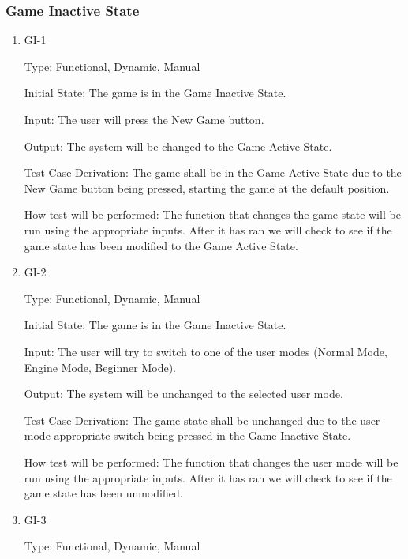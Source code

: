 \documentclass[12pt, titlepage]{article}
\begin{document}
\subsubsection{Game Inactive State}

\begin{enumerate}

  \item{GI-1\\}

  Type: Functional, Dynamic, Manual
                      
  Initial State: The game is in the Game Inactive State.
                      
  Input: The user will press the New Game button.
                      
  Output: The system will be changed to the Game Active State.
                      
  Test Case Derivation: The game shall be in the Game Active State due to the New Game button being pressed,
  starting the game at the default position.
  
  How test will be performed: The function that changes the game state will be run using the appropriate inputs.
  After it has ran we will check to see if the game state has been modified to the Game Active State.

  \item{GI-2\\}

  Type: Functional, Dynamic, Manual
                      
  Initial State: The game is in the Game Inactive State.
                      
  Input: The user will  try to switch to one of the user modes (Normal Mode, Engine Mode, Beginner Mode).
  
  Output: The system will be unchanged to the selected user mode.
                      
  Test Case Derivation: The game state shall be unchanged due to the user mode appropriate switch being pressed in the Game Inactive State.
  
  How test will be performed: The function that changes the user mode will be run using the appropriate inputs.
  After it has ran we will check to see if the game state has been unmodified.

  \item{GI-3\\}

  Type: Functional, Dynamic, Manual
                      

\end{enumerate}
\end{document}
